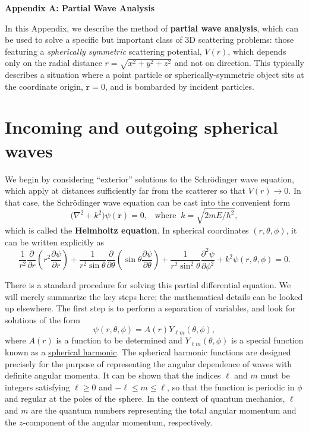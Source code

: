 \documentclass[pra,12pt]{revtex4}
\begin{document}
\begin{center}
{\large \textbf{Appendix A: Partial Wave Analysis}}
\end{center}

In this Appendix, we describe the method of \textbf{partial wave
  analysis}, which can be used to solve a specific but important class
of 3D scattering problems: those featuring a \textit{spherically
  symmetric} scattering potential, $V(r)$, which depends only on the
radial distance $r = \sqrt{x^2 + y^2 + z^2}$ and not on direction.
This typically describes a situation where a point particle or
spherically-symmetric object sits at the coordinate origin,
$\mathbf{r} = 0$, and is bombarded by incident particles.

\section{Incoming and outgoing spherical waves}

We begin by considering ``exterior'' solutions to the Schr\"odinger
wave equation, which apply at distances sufficiently far from the
scatterer so that $V(r) \rightarrow 0$.  In that case, the
Schr\"odinger wave equation can be cast into the convenient form
$$\Big(\nabla^2 + k^2\Big) \psi(\mathbf{r}) = 0,\;\;\;\mathrm{where}\;\;k = \sqrt{2mE/\hbar^2},$$
which is called the \textbf{Helmholtz equation}.  In spherical
coordinates $(r,\theta,\phi)$, it can be written explicitly as
$$\frac{1}{r^2}\frac{\partial}{\partial r}\left(r^2\frac{\partial \psi}{\partial r}\right) + \frac{1}{r^2\sin\theta}\frac{\partial}{\partial\theta}\left(\sin\theta\frac{\partial\psi}{\partial\theta}\right)+\frac{1}{r^2\sin^2\theta}\frac{\partial^2\psi}{\partial\phi^2} + k^2\psi(r,\theta,\phi) = 0.$$

There is a standard procedure for solving this partial differential
equation.  We will merely summarize the key steps here; the
mathematical details can be looked up elsewhere.  The first step is to
perform a separation of variables, and look for solutions of the
form
$$\psi(r,\theta,\phi) = A(r) Y_{\ell m}(\theta,\phi),$$
where $A(r)$ is a function to be determined and $Y_{\ell m}(\theta,\phi)$
is a special function known as a
\href{https://en.wikipedia.org/wiki/Spherical_harmonics}{spherical
  harmonic}.  The spherical harmonic functions are designed precisely
for the purpose of representing the angular dependence of waves with
definite angular momenta.  It can be shown that the indices $\ell$ and
$m$ must be integers satisfying $\ell \ge 0$ and $-\ell\le m \le \ell$, so that
the function is periodic in $\phi$ and regular at the poles of the
sphere.  In the context of quantum mechanics, $\ell$ and $m$ are the
quantum numbers representing the total angular momentum and the
$z$-component of the angular momentum, respectively.
\end{document}
